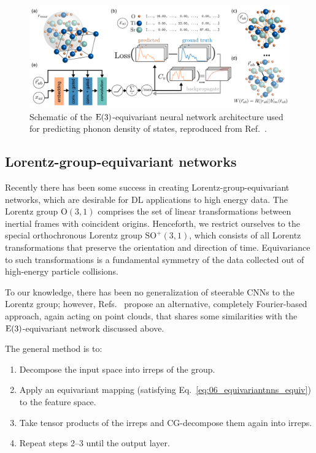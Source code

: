 \begin{figure}[ht]
    \centering
    \includegraphics[width=\textwidth]{figures/06-ML4Jets/equivariantnns/dos}
    \caption{Schematic of the $\EE[3]$-equivariant neural network architecture used for predicting phonon density of states, reproduced from Ref.~\cite{chen2020direct}.}
    \label{fig:06_equivariantnns_dos}
\end{figure}


\subsection{Lorentz-group-equivariant networks}
\label{sec:06_equivariantnns_lorentz}

Recently there has been some success in creating Lorentz-group-equivariant networks, which are desirable for DL applications to high energy data. 
The Lorentz group $\mathrm{O}(3, 1)$ comprises the set of linear transformations between inertial frames with coincident origins.
Henceforth, we restrict ourselves to the special orthochronous Lorentz group $\mathrm{SO}^+(3, 1)$, which consists of all Lorentz transformations that preserve the orientation and direction of time.
Equivariance to such transformations is a fundamental symmetry of the data collected out of high-energy particle collisions.

To our knowledge, there has been no generalization of steerable CNNs to the Lorentz group; however, Refs.~\cite{equivariance-Fourier-Kondor,equivariance-Fourier-Anderson,E(2)-Equivariant, bogatskiy2020lorentz} propose an alternative, completely Fourier-based approach, again acting on point clouds, that shares some similarities with the $\EE[3]$-equivariant network discussed above.

The general method is to:

\begin{enumerate}
    \item Decompose the input space into irreps of the group.
    \item Apply an equivariant mapping (satisfying Eq.~\ref{eq:06_equivariantnns_equiv}) to the feature space.
    \item Take tensor products of the irreps and CG-decompose them again into irreps.
    \item Repeat steps 2--3 until the output layer. 
\end{enumerate}

